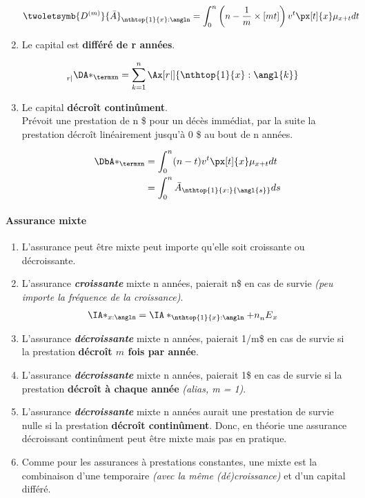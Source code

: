 \documentclass[10pt, french]{article}
\begin{document}
\begin{multicols*}{3}
\begin{enumerate}
\begin{align*}
	\twoletsymb{D^{(m)}}{\bar{A}}_{\nthtop{1}{x}:\angln} &= \int_0^n \left(n - \frac{1}{m} \times [m t] \right) v^t \px[t]{x} \mu_{x+t} dt 
\end{align*}

	\item[] Le capital est \textbf{différé de r années}.

\begin{align*}
	\prescript{}{r|}{\DA*_{\termxn}} 
	&= \sum_{k = 1}^{n} \Ax[r|]{\nthtop{1}{x}:\angl{k}} 
\end{align*}

	\item[] Le capital \textbf{décroît continûment}.\\
	Prévoit une prestation de n \$ pour un décès immédiat, par la suite la prestation décroît linéairement jusqu'à 0 \$ au bout de n années.

\begin{align*}
	\DbA*_{\termxn} &= \int_0^{n} (n - t) v^t \px[t]{x} \mu_{x+t} dt \\
	&= \int_0^{n} \bar{A}_{\nthtop{1}{x:}{\angl{s}}} ds
\end{align*}

\end{enumerate}

\paragraph{Assurance mixte}

\begin{enumerate}
	\item[] L'assurance peut être mixte peut importe qu'elle soit croissante ou décroissante.
	\item[] L'assurance \textit{\textbf{croissante}} mixte n années, paierait n\$ en cas de survie \textit{(peu importe la fréquence de la croissance)}.
	\begin{align*}
		\IA*_{x:\angln} &= \IA*_{\nthtop{1}{x}:\angln}  + n {\prescript{}{n}E_{x}} 
	\end{align*}
	\item[] L'assurance \textit{\textbf{décroissante}} mixte n années, paierait 1/m\$ en cas de survie si la prestation \textbf{décroît $m$ fois par année}.
	\item[] L'assurance \textit{\textbf{décroissante}} mixte n années, paierait 1\$ en cas de survie si la prestation \textbf{décroît à chaque année} \textit{(alias, m = 1)}.
	\item[] L'assurance \textit{\textbf{décroissante}} mixte n années aurait une prestation de survie nulle si la prestation \textbf{décroît continûment}. Donc, en théorie une assurance décroissant continûment peut être mixte mais pas en pratique.
	\item[] Comme pour les assurances à prestations constantes, une mixte est la combinaison d'une temporaire \textit{(avec la même (dé)croissance)} et d'un capital différé.
\end{enumerate}


\end{multicols*}
\end{document}
